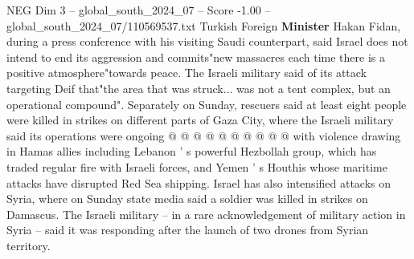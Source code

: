 \begin{textsample}{NEG Dim 3 – global\_south\_2024\_07 – Score -1.00 – global\_south\_2024\_07/110569537.txt}
Turkish Foreign \textbf{Minister} Hakan Fidan, during a press conference with his visiting Saudi counterpart, said Israel does not intend to end its aggression and commits"new massacres each time there is a positive atmosphere"towards peace.
The Israeli military said of its attack targeting Deif that"the area that was struck... was not a tent complex, but an operational compound".
Separately on Sunday, rescuers said at least eight people were killed in strikes on different parts of Gaza City, where the Israeli military said its operations were ongoing @ @ @ @ @ @ @ @ @ @ with violence drawing in Hamas allies including Lebanon ' s powerful Hezbollah group, which has traded regular fire with Israeli forces, and Yemen ' s Houthis whose maritime attacks have disrupted Red Sea shipping.
Israel has also intensified attacks on Syria, where on Sunday state media said a soldier was killed in strikes on Damascus.
The Israeli military -- in a rare acknowledgement of military action in Syria -- said it was responding after the launch of two drones from Syrian territory.

\end{textsample}

